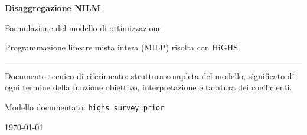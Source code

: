 \documentclass[11pt,a4paper]{report}
\newcommand{\code}[1]{\texttt{\small #1}}
\begin{document}
\begin{titlepage}
\centering
\vspace*{2.5cm}

{\Huge\bfseries\color{CorpBlue} Disaggregazione NILM\par}
\vspace{0.6cm}
{\LARGE\color{CorpGray} Formulazione del modello di ottimizzazione\par}
\vspace{0.3cm}
{\large\color{CorpGray} Programmazione lineare mista intera (MILP) risolta con HiGHS\par}

\vspace{2.2cm}
\rule{0.75\textwidth}{1.2pt}

\vspace{1.2cm}
\begin{minipage}{0.8\textwidth}
\centering\large\color{CorpGray}
Documento tecnico di riferimento: struttura completa del modello,
significato di ogni termine della funzione obiettivo,
interpretazione e taratura dei coefficienti.
\end{minipage}

\vfill
{\large\color{CorpGray} Modello documentato: \code{highs\_survey\_prior}\par}
\vspace{0.4cm}
{\color{CorpGray}\today\par}
\end{titlepage}

\tableofcontents
\cleardoublepage










% 
\end{document}

